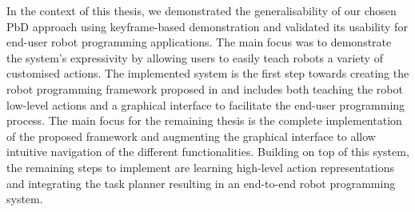 In the context of this thesis, we demonstrated the generalisability of our chosen PbD approach using keyframe-based demonstration and validated its usability for end-user robot programming applications.
The main focus was to demonstrate the system's expressivity by allowing users to easily teach robots a variety of customised actions.
The implemented system is the first step towards creating the robot programming framework proposed in  and includes both teaching the robot low-level actions and a graphical interface to facilitate the end-user programming process.
The main focus for the remaining thesis is the complete implementation of the proposed framework and augmenting the graphical interface to allow intuitive navigation of the different functionalities. 
Building on top of this system, the remaining steps to implement are learning high-level action representations and integrating the task planner resulting in an end-to-end robot programming system.